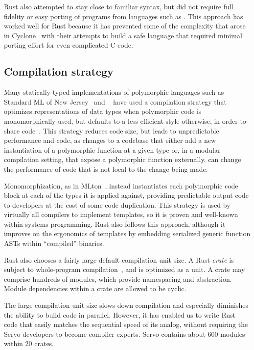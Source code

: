 Rust also attempted to stay close to familiar syntax, but did not require full fidelity or easy porting of
programs from languages such as \Cplusplus{}.
This approach has worked well for Rust because it has prevented some of the complexity that arose in
Cyclone~\cite{cyclone} with their attempts to build a safe language that required minimal porting effort
for even complicated C code.

\subsection{Compilation strategy}
Many statically typed implementations of polymorphic languages such as Standard ML of New Jersey~\cite{SMLNJ} and
\ocaml{}~\cite{ocaml-manual-3.0} have used a compilation strategy that optimizes representations of data types when
polymorphic code is monomorphically used, but defaults to a less efficient style otherwise, in order to share
code~\cite{ocaml-repr}.
This strategy reduces code size, but leads to unpredictable performance and code, as changes to a codebase that
either add a new instantiation of a polymorphic function at a given type or, in a modular compilation setting, that
expose a polymorphic function externally, can change the performance of code that is not local to the change being
made.

Monomorphization, as in MLton~\cite{mlton-compiler}, instead instantiates each polymorphic code block at each of the types
it is applied against, providing predictable output code to developers at the cost of some code duplication.
This strategy is used by virtually all \Cplusplus{} compilers to implement templates, so it is proven and well-known
within systems programming.
Rust also follows this approach, although it improves on the ergonomics of \Cplusplus{} templates
by embedding serialized generic function ASTs within ``compiled'' binaries.

Rust also chooses a fairly large default compilation unit size. A Rust \textit{crate} is subject to whole-program
compilation~\cite{weeks:whole-program-mlton}, and is optimized as a unit. A crate may comprise hundreds of modules,
which provide namespacing and abstraction. Module dependencies within a crate are allowed to be cyclic.

The large compilation unit size slows down compilation and especially diminishes the ability to build code in parallel.
However, it has enabled us to write Rust code that easily matches the sequential speed of its \Cplusplus{} analog, without requiring the Servo developers to become compiler experts.
Servo contains about 600 modules within 20 crates.


